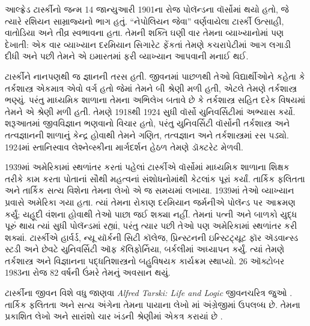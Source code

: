 \label{guunit:OLP-0630}





આલ્ફ્રેડ ટાર્સ્કીનો જન્મ 14 જાન્યુઆરી
1901ના રોજ પોલૅન્ડના વૉર્સોમાં થયો હતો,
જે ત્યારે રશિયન સામ્રાજ્યનો ભાગ હતું.
“નેપોલિયન જેવા” વર્ણવાયેલા ટાર્સ્કી
ઉત્સાહી, વાતોડિયા અને તીવ્ર સ્વભાવના
હતા. તેમની શક્તિ ઘણી વાર તેમના
વ્યાખ્યાનોમાં પણ દેખાતી: એક વાર
વ્યાખ્યાન દરમિયાન સિગારેટ ફેંકતાં
તેમણે કચરાપેટીમાં આગ લગાડી દીધી
અને પછી તેમને એ ઇમારતમાં
ફરી વ્યાખ્યાન આપવાની મનાઈ થઈ.

ટાર્સ્કીને નાનપણથી જ જ્ઞાનની
તરસ હતી. જીવનમાં પાછળથી
તેઓ વિદ્યાર્થીઓને કહેતા કે
તર્કશાસ્ત્ર એકમાત્ર એવો વર્ગ
હતો જેમાં તેમને બી શ્રેણી
મળી હતી, એટલે તેમણે
તર્કશાસ્ત્ર ભણ્યું. પરંતુ
માધ્યમિક શાળાના તેમના
અભિલેખ બતાવે છે કે
તર્કશાસ્ત્ર સહિત દરેક
વિષયમાં તેમને એ શ્રેણી
મળી હતી. તેમણે 1918થી
1924 સુધી વૉર્સો
યુનિવર્સિટીમાં અભ્યાસ
કર્યો. શરૂઆતમાં જીવવિજ્ઞાન
ભણવાનો વિચાર હતો, પરંતુ
યુનિવર્સિટી વૉર્સોની
તર્કશાસ્ત્ર અને તત્વજ્ઞાનની
શાળાનું કેન્દ્ર હોવાથી
તેમને ગણિત, તત્વજ્ઞાન અને
તર્કશાસ્ત્રમાં રસ પડ્યો.
1924માં સ્તાનિસ્વાવ
લેશ્નેવ્સ્કીના માર્ગદર્શન
હેઠળ તેમણે ડૉક્ટરેટ મેળવી.

1939માં અમેરિકામાં સ્થળાંતર
કરતાં પહેલાં ટાર્સ્કીએ
વૉર્સોમાં માધ્યમિક શાળાના
શિક્ષક તરીકે કામ કરતા
પોતાનાં સૌથી મહત્વનાં સંશોધનોમાંથી
કેટલાંક પૂરાં કર્યાં.
તાર્કિક ફલિતતા અને
તાર્કિક સત્ય વિશેના
તેમના લેખો એ જ સમયમાં
લખાયા. 1939માં તેઓ
વ્યાખ્યાન પ્રવાસે
અમેરિકા ગયા હતા. ત્યાં
તેમના રોકાણ દરમિયાન
જર્મનીએ પોલૅન્ડ પર
આક્રમણ કર્યું; યહૂદી
વંશના હોવાથી તેઓ
પાછા જઈ શક્યા નહીં.
તેમનાં પત્ની અને
બાળકો યુદ્ધ પૂરું થાય
ત્યાં સુધી પોલૅન્ડમાં
રહ્યાં, પરંતુ ત્યાર
પછી તેઓ પણ અમેરિકામાં
સ્થળાંતર કરી શક્યાં.
ટાર્સ્કીએ હાર્વર્ડ,
ન્યૂ યૉર્કની સિટી
કૉલેજ, પ્રિન્સ્ટનની
ઇન્સ્ટિટ્યૂટ ફૉર
ઍડવાન્સ્ડ સ્ટડી
અને છેવટે યુનિવર્સિટી
ઑફ કૅલિફોર્નિયા,
બર્કલીમાં અધ્યાપન
કર્યું. ત્યાં તેમણે
તર્કશાસ્ત્ર અને વિજ્ઞાનના
પદ્ધતિશાસ્ત્રનો બહુવિષયક
કાર્યક્રમ સ્થાપ્યો.
26 ઑક્ટોબર 1983ના
રોજ 82 વર્ષની
ઉંમરે તેમનું અવસાન
થયું.



\begin{reading} 
ટાર્સ્કીના જીવન
વિશે વધુ જાણવા
\emph{Alfred Tarski: Life
  and Logic}
જીવનચરિત્ર જુઓ
\citep{Feferman2004}.
તાર્કિક ફલિતતા અને
સત્ય અંગેના તેમના
પાયાના લેખો
\citep{Tarski1983}માં
અંગ્રેજીમાં ઉપલબ્ધ
છે. તેમના પ્રકાશિત
લેખો અને સારાંશો ચાર
ખંડની શ્રેણીમાં
એકત્ર કરાયાં છે
\citep{Tarski1981}.
\end{reading}
\endgroup


